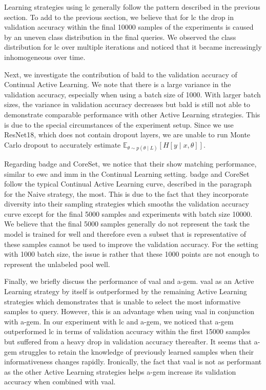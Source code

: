 Learning strategies using \gls{lc} generally follow the pattern described in the previous section. To add to the previous section, we believe that for \gls{lc} the drop in
validation accuracy within the final 10000 samples of the experiments is caused by an uneven class distribution in the final queries. We observed the class distribution
for \gls{lc} over multiple iterations and noticed that it became increasingly inhomogeneous over time. \par
Next, we investigate the contribution of \gls{bald} to the validation accuracy of Continual Active Learning. We note that there is a large variance in the validation
accuracy, especially when using a batch size of 1000. With larger batch sizes, the variance in validation accuracy decreases but \gls{bald} is still not able to demonstrate
comparable performance with other Active Learning strategies. This is due to the special circumstances of the experiment setup. Since we use ResNet18, which does not contain
dropout layers, we are unable to run Monte Carlo dropout to accurately estimate $\mathbb{E}_{\theta \sim p(\theta \mid L)} [H[y \mid x, \theta]]$. \par
Regarding \gls{badge} and CoreSet, we notice that their show matching performance, similar to \gls{ewc} and \gls{imm} in the Continual Learning setting. \gls{badge} and CoreSet follow
the typical Continual Active Learning curve, described in the paragraph for the Naive strategy, the most. This is due to the fact that they incorporate diversity into their
sampling strategies which smooths the validation accuracy curve except for the final 5000 samples and experiments with batch size 10000. We believe that the final 5000 samples
generally do not represent the task the model is trained for well and therefore even a subset that is representative of these samples cannot be used to improve the validation
accuracy. For the setting with 1000 batch size, the issue is rather that these 1000 points are not enough to represent the unlabeled pool well. \par
Finally, we briefly discuss the performance of \gls{vaal} and \gls{a-gem}. \gls{vaal} as an Active Learning strategy by itself is outperformed by the remaining Active
Learning strategies which demonstrates that is unable to select the most informative samples to query. However, this is an advantage when using \gls{vaal} in conjunction
with \gls{a-gem}. In our experiment with \gls{lc} and \gls{a-gem}, we noticed that \gls{a-gem} outperformed \gls{lc} in terms of validation accuracy within the first 15000
samples but suffered from a heavy drop in validation accuracy thereafter. It seems that \gls{a-gem} struggles to retain the knowledge of previously learned samples when
their informativeness changes rapidly. Ironically, the fact that \gls{vaal} is not as performant as the other Active Learning strategies helps \gls{a-gem} increase its
validation accuracy when combined with \gls{vaal}. \par

